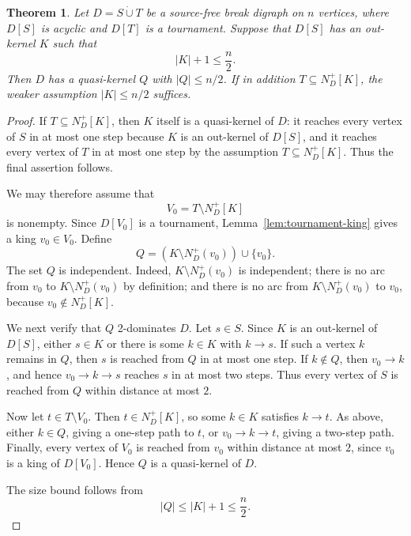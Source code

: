 \documentclass[11pt,a4paper]{article}
\newtheorem{theorem}{Theorem}[section]
\begin{document}
\begin{theorem}\label{thm:outkernel-side}
Let \(D=S\dot\cup T\) be a source-free break digraph on \(n\) vertices, where
\(D[S]\) is acyclic and \(D[T]\) is a tournament. Suppose that \(D[S]\) has an
out-kernel \(K\) such that
\[
    |K|+1\le \frac n2.
\]
Then \(D\) has a quasi-kernel \(Q\) with \(|Q|\le n/2\). If in addition
\(T\subseteq N_D^+[K]\), the weaker assumption \(|K|\le n/2\) suffices.
\end{theorem}

\begin{proof}
If \(T\subseteq N_D^+[K]\), then \(K\) itself is a quasi-kernel of \(D\): it
reaches every vertex of \(S\) in at most one step because \(K\) is an out-kernel
of \(D[S]\), and it reaches every vertex of \(T\) in at most one step by the
assumption \(T\subseteq N_D^+[K]\). Thus the final assertion follows.

We may therefore assume that
\[
    V_0=T\setminus N_D^+[K]
\]
is nonempty. Since \(D[V_0]\) is a tournament, Lemma~\ref{lem:tournament-king}
gives a king \(v_0\in V_0\). Define
\[
    Q=(K\setminus N_D^+(v_0))\cup\{v_0\}.
\]
The set \(Q\) is independent. Indeed, \(K\setminus N_D^+(v_0)\) is independent;
there is no arc from \(v_0\) to \(K\setminus N_D^+(v_0)\) by definition; and
there is no arc from \(K\setminus N_D^+(v_0)\) to \(v_0\), because
\(v_0\notin N_D^+[K]\).

We next verify that \(Q\) 2-dominates \(D\). Let \(s\in S\). Since \(K\) is an
out-kernel of \(D[S]\), either \(s\in K\) or there is some \(k\in K\) with
\(k\to s\). If such a vertex \(k\) remains in \(Q\), then \(s\) is reached from
\(Q\) in at most one step. If \(k\notin Q\), then \(v_0\to k\), and hence
\(v_0\to k\to s\) reaches \(s\) in at most two steps. Thus every vertex of
\(S\) is reached from \(Q\) within distance at most \(2\).

Now let \(t\in T\setminus V_0\). Then \(t\in N_D^+[K]\), so some \(k\in K\)
satisfies \(k\to t\). As above, either \(k\in Q\), giving a one-step path to
\(t\), or \(v_0\to k\to t\), giving a two-step path. Finally, every vertex of
\(V_0\) is reached from \(v_0\) within distance at most \(2\), since \(v_0\) is a
king of \(D[V_0]\). Hence \(Q\) is a quasi-kernel of \(D\).

The size bound follows from
\[
    |Q|\le |K|+1\le \frac n2.
\]
\end{proof}
\end{document}
